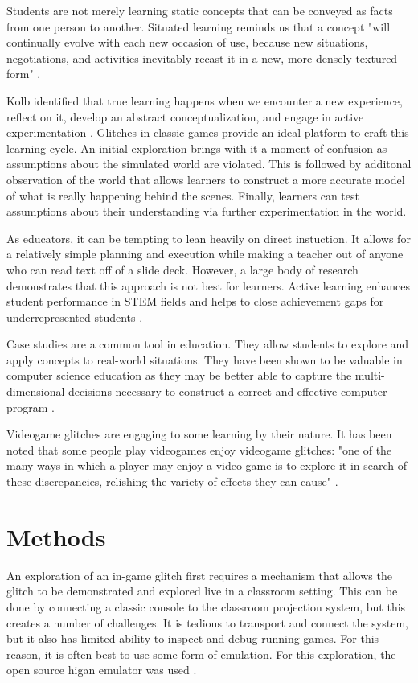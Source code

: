 \documentclass[letterpaper]{article}
\begin{document}
Students are not merely learning static concepts that can be conveyed as facts from one person to another. Situated learning reminds us that a concept "will continually evolve with each new occasion of use, because new situations, negotiations, and activities inevitably recast it in a new, more densely textured form" \cite{brown1989situated}.

Kolb identified that true learning happens when we encounter a new experience, reflect on it, develop an abstract conceptualization, and engage in active experimentation \cite{kolb84}. Glitches in classic games provide an ideal platform to craft this learning cycle. An initial exploration brings with it a moment of confusion as assumptions about the simulated world are violated. This is followed by additonal observation of the world that allows learners to construct a more accurate model of what is really happening behind the scenes. Finally, learners can test assumptions about their understanding via further experimentation in the world.

As educators, it can be tempting to lean heavily on direct instuction. It allows for a relatively simple planning and execution while making a teacher out of anyone who can read text off of a slide deck. However, a large body of research demonstrates that this approach is not best for learners. Active learning enhances student performance in STEM fields \cite{freeman2014active} and helps to close achievement gaps for underrepresented students \cite{theobald2020active}.

Case studies are a common tool in education. They allow students to explore and apply concepts to real-world situations. They have been shown to be valuable in computer science education as they may be better able to capture the multi-dimensional decisions necessary to construct a correct and effective computer program \cite{linn1992case}.

Videogame glitches are engaging to some learning by their nature. It has been noted that some people play videogames enjoy videogame glitches: "one of the many ways in which a player may enjoy a video game is to explore it in search of these discrepancies, relishing the variety of effects they can cause" \cite{bainbridge2007creative}.

\section{Methods}
An exploration of an in-game glitch first requires a mechanism that allows the glitch to be demonstrated and explored live in a classroom setting. This can be done by connecting a classic console to the classroom projection system, but this creates a number of challenges. It is tedious to transport and connect the system, but it also has limited ability to inspect and debug running games. For this reason, it is often best to use some form of emulation. For this exploration, the open source higan emulator was used \cite{ginder2004higan}.
\end{document}
